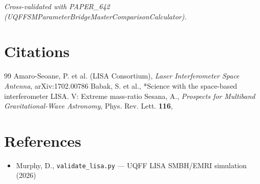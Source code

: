 \documentclass[12pt,a4paper]{article}
\begin{document}
\emph{Cross-validated with PAPER\_642 (UQFFSMParameterBridgeMasterComparisonCalculator).}


\section*{Citations}
\begin{thebibliography}{99}
 Amaro-Seoane, P. et al. (LISA Consortium), \emph{Laser Interferometer Space Antenna}, arXiv:1702.00786
 Babak, S. et al., *Science with the space-based interferometer LISA. V: Extreme mass-ratio
 Sesana, A., \emph{Prospects for Multiband Gravitational-Wave Astronomy}, Phys. Rev. Lett. \textbf{116},
\end{thebibliography}

\section*{References}
\begin{itemize}
  \item[4.] Murphy, D., \texttt{validate\_lisa.py} --- UQFF LISA SMBH/EMRI simulation (2026)
\end{itemize}

\end{document}
